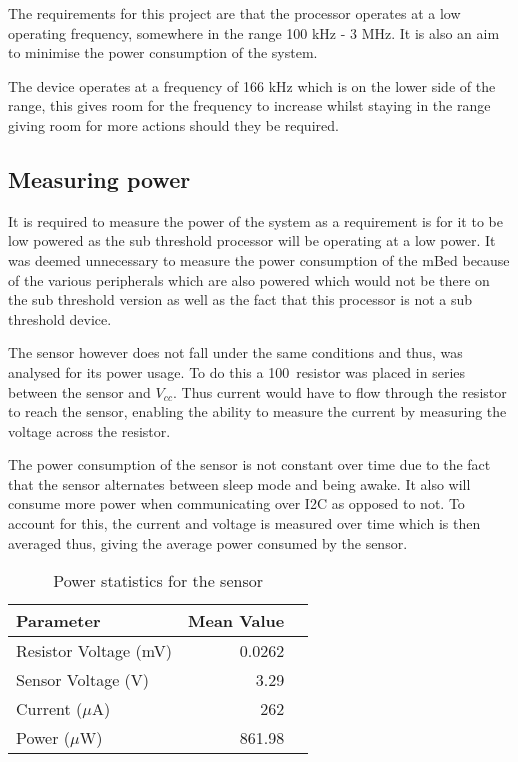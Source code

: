 
The requirements for this project are that the processor operates at a low operating frequency, somewhere in the range 100 kHz - 3 MHz. It is also an aim to minimise the power consumption of the system. 

The device operates at a frequency of 166 kHz which is on the lower side of the range, this gives room for the frequency to increase whilst staying in the range giving room for more actions should they be required.

\subsection{Measuring power}

It is required to measure the power of the system as a requirement is for it to be low powered as the sub threshold processor will be operating at a low power. It was deemed unnecessary to measure the power consumption of the mBed because of the various peripherals which are also powered which would not be there on the sub threshold version as well as the fact that this processor is not a sub threshold device. 

The sensor however does not fall under the same conditions and thus, was analysed for its power usage. To do this a 100\ohm ~resistor was placed in series between the sensor and $V_{cc}$. Thus current would have to flow through the resistor to reach the sensor, enabling the ability to measure the current by measuring the voltage across the resistor.

The power consumption of the sensor is not constant over time due to the fact that the sensor alternates between sleep mode and being awake. It also will consume more power when communicating over I2C as opposed to not. To account for this, the current and voltage is measured over time which is then averaged thus, giving the average power consumed by the sensor.

\begin{table}
    \centering
    \begin{tabular}{|l|r|r|}
        \hline
        Parameter & Mean Value \\
        \hline
        Resistor Voltage (mV) & 0.0262 \\
        Sensor Voltage (V) & 3.29 \\
        Current ($\mu$A) & 262 \\
        Power ($\mu$W) & 861.98 \\
        \hline
    \end{tabular}
    \caption{Power statistics for the sensor}
    \label{tab:power}
\end{table}

